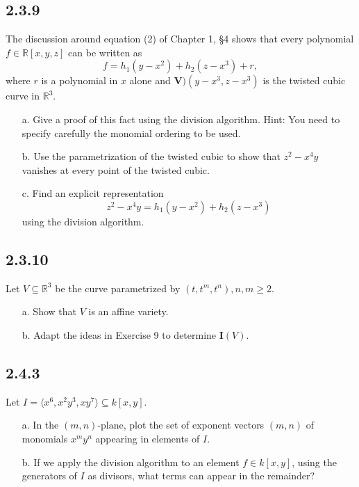 \documentclass[]{article}
\newcommand\<{\langle}
\renewcommand\>{\rangle}
\newcommand{\RR}{\ensuremath{\mathbb{R}}}
\begin{document}
\subsection*{2.3.9} The discussion around equation (2) of Chapter 1, \S4 shows that every polynomial $f \in \RR[x,y,z]$ can be written as
$$
	f = h_1\left(y - x^2\right) + h_2\left(z-x^3\right) + r,
$$
where $r$ is a polynomial in $x$ alone and $\textbf{V})\left(y-x^3, z-x^3\right)$ is the twisted cubic curve in $\RR^3$.
\begin{enumerate}
	\item[a.] Give a proof of this fact using the division algorithm. Hint: You need to specify carefully the monomial ordering to be used. 
	\item[b.] Use the parametrization of the twisted cubic to show that $z^2 - x^4y$ vanishes at every point of the twisted cubic.
	\item[c.] Find an explicit representation 
	$$
		z^2 - x^4y = h_1\left(y - x^2\right) + h_2\left(z - x^3\right)
	$$
	using the division algorithm.
\end{enumerate}

\subsection*{2.3.10} Let $V \subseteq \RR^3$ be the curve parametrized by $\left(t, t^m, t^n\right), n, m \geq 2.$
\begin{enumerate}
	\item[a.] Show that $V$ is an affine variety.
	\item[b.] Adapt the ideas in Exercise 9 to determine $\textbf{I}(V)$.
\end{enumerate}

\subsection*{2.4.3} Let $I = \<x^6, x^2y^3,xy^7\> \subseteq k[x,y].$
\begin{enumerate}
	\item[a.] In the $(m, n)\text{-plane}$, plot the set of exponent vectors $\left(m,n\right)$ of monomials $x^my^n$ appearing in elements of $I$.
	\item[b.] If we apply the division algorithm to an element $f \in k[x,y]$, using the generators of $I$ as divisors, what terms can appear in the remainder?
\end{enumerate}
\end{document}
